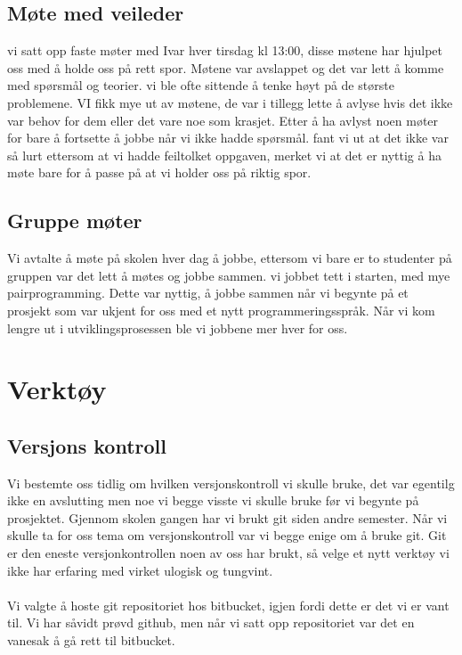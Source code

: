 \subsection{Møte med veileder}
vi satt opp faste møter med Ivar hver tirsdag kl 13:00, disse møtene har hjulpet oss med å holde oss på rett spor. Møtene var avslappet og det var lett å komme med spørsmål og teorier. vi ble ofte sittende å tenke høyt på de største problemene. VI fikk mye ut av møtene, de var i tillegg lette å avlyse hvis det ikke var behov for dem eller det vare noe som krasjet. Etter å ha avlyst noen møter for bare å fortsette å jobbe når vi ikke hadde spørsmål. fant vi ut at det ikke var så lurt ettersom at vi hadde feiltolket oppgaven, merket vi at det er nyttig å ha møte bare for å passe på at vi holder oss på riktig spor.

\subsection{Gruppe møter} 
Vi avtalte å møte på skolen hver dag å jobbe, ettersom vi bare er to studenter på gruppen var det lett å møtes og jobbe sammen. vi jobbet tett i starten, med mye pairprogramming. Dette var nyttig, å jobbe sammen når vi begynte på et prosjekt som var ukjent for oss med et nytt programmeringsspråk. Når vi kom lengre ut i utviklingsprosessen ble vi jobbene mer hver for oss.


\section{Verktøy}
\subsection{Versjons kontroll}
Vi bestemte oss tidlig om hvilken versjonskontroll vi skulle bruke, det var egentilg ikke en avslutting men noe vi begge visste vi skulle bruke før vi begynte på prosjektet. Gjennom skolen gangen har vi brukt git siden andre semester. Når vi skulle ta for oss tema om versjonskontroll var vi begge enige om å bruke git. Git er den eneste versjonkontrollen noen av oss har brukt, så velge et nytt verktøy vi ikke har erfaring med virket ulogisk og tungvint. \\ \\
Vi valgte å hoste git repositoriet hos bitbucket, igjen fordi dette er det vi er vant til. Vi har såvidt prøvd github, men når vi satt opp repositoriet var det en vanesak å gå rett til bitbucket.

